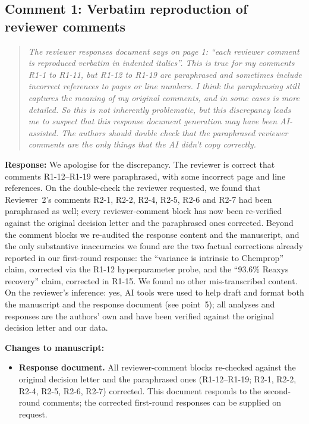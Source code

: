 \documentclass[11pt]{article}
\newenvironment{reviewer}{%
  \begin{quote}\itshape\color{black!70}}{%
  \end{quote}}
\newcommand{\response}[1]{\noindent\textbf{Response:} #1\par\medskip}
\newenvironment{changes}{%
  \noindent\textbf{Changes to manuscript:}
  \begin{itemize}[leftmargin=2em,itemsep=2pt]}{%
  \end{itemize}\medskip}
\begin{document}
\subsection*{Comment 1: Verbatim reproduction of reviewer comments}
\begin{reviewer}
The reviewer responses document says on page 1: ``each reviewer comment is reproduced verbatim in indented italics''. This is true for my comments R1-1 to R1-11, but R1-12 to R1-19 are paraphrased and sometimes include incorrect references to pages or line numbers. I think the paraphrasing still captures the meaning of my original comments, and in some cases is more detailed. So this is not inherently problematic, but this discrepancy leads me to suspect that this response document generation may have been AI-assisted. The authors should double check that the paraphrased reviewer comments are the only things that the AI didn't copy correctly.
\end{reviewer}
\response{We apologise for the discrepancy. The reviewer is correct that comments R1-12--R1-19 were paraphrased, with some incorrect page and line references. On the double-check the reviewer requested, we found that Reviewer~2's comments R2-1, R2-2, R2-4, R2-5, R2-6 and R2-7 had been paraphrased as well; every reviewer-comment block has now been re-verified against the original decision letter and the paraphrased ones corrected. Beyond the comment blocks we re-audited the response content and the manuscript, and the only substantive inaccuracies we found are the two factual corrections already reported in our first-round response: the ``variance is intrinsic to Chemprop'' claim, corrected via the R1-12 hyperparameter probe, and the ``93.6\% Reaxys recovery'' claim, corrected in R1-15. We found no other mis-transcribed content. On the reviewer's inference: yes, AI tools were used to help draft and format both the manuscript and the response document (see point~5); all analyses and responses are the authors' own and have been verified against the original decision letter and our data.}
\begin{changes}
  \item \textbf{Response document.} All reviewer-comment blocks re-checked against the original decision letter and the paraphrased ones (R1-12--R1-19; R2-1, R2-2, R2-4, R2-5, R2-6, R2-7) corrected. This document responds to the second-round comments; the corrected first-round responses can be supplied on request.
\end{changes}
\end{document}
